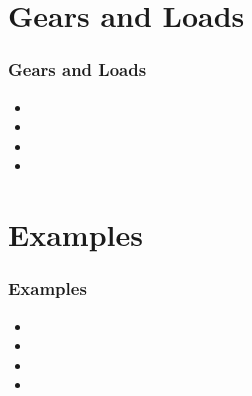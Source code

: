 \documentclass[fleqn]{beamer} %
\newcommand{\sectiontitleIII}{Gears and Loads}
\newcommand{\sectiontitleIV}{Examples}
\begin{document}
\section{\sectiontitleIII}	

	\begin{frame}[label=sectionIII] \small
		\frametitle{\sectiontitleIII}
	 
	       \begin{itemize}
	            \item 
	            \item 
	            \item 
	            \item 
	        \end{itemize}

		\end{frame}  
	
\section{\sectiontitleIV}	
	    \begin{frame}[label=sectionIV] \small
		\frametitle{\sectiontitleIV}    
  
  			\begin{itemize}
	            \item 
	            \item 
	            \item 
	            \item 
	        \end{itemize}

		\end{frame}
		
\end{document}
